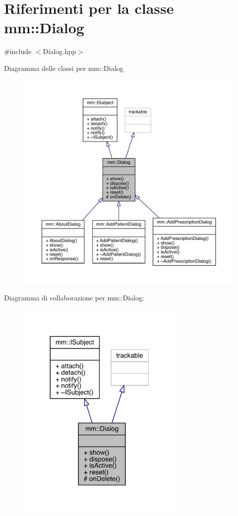 \hypertarget{classmm_1_1_dialog}{}\section{Riferimenti per la classe mm\+:\+:Dialog}
\label{classmm_1_1_dialog}


{\ttfamily \#include $<$Dialog.\+hpp$>$}



Diagramma delle classi per mm\+:\+:Dialog
\nopagebreak
\begin{figure}[H]
\begin{center}
\leavevmode
\includegraphics[width=350pt]{d8/dfd/classmm_1_1_dialog__inherit__graph}
\end{center}
\end{figure}


Diagramma di collaborazione per mm\+:\+:Dialog\+:
\nopagebreak
\begin{figure}[H]
\begin{center}
\leavevmode
\includegraphics[width=228pt]{d7/d10/classmm_1_1_dialog__coll__graph}
\end{center}
\end{figure}
